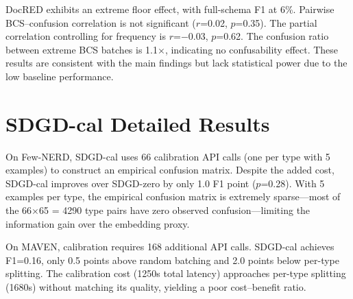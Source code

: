 \documentclass[11pt,a4paper]{article}
\begin{document}
DocRED exhibits an extreme floor effect, with full-schema F1 at 6\%.
Pairwise BCS--confusion correlation is not significant ($r$=0.02, $p$=0.35).
The partial correlation controlling for frequency is $r$=$-$0.03, $p$=0.62.
The confusion ratio between extreme BCS batches is 1.1$\times$, indicating no confusability effect.
These results are consistent with the main findings but lack statistical power due to the low baseline performance.

\section{SDGD-cal Detailed Results}

On Few-NERD, SDGD-cal uses 66 calibration API calls (one per type with 5 examples) to construct an empirical confusion matrix.
Despite the added cost, SDGD-cal improves over SDGD-zero by only 1.0 F1 point ($p$=0.28).
With 5 examples per type, the empirical confusion matrix is extremely sparse---most of the 66$\times$65 = 4290 type pairs have zero observed confusion---limiting the information gain over the embedding proxy.

On MAVEN, calibration requires 168 additional API calls.
SDGD-cal achieves F1=0.16, only 0.5 points above random batching and 2.0 points below per-type splitting.
The calibration cost (1250s total latency) approaches per-type splitting (1680s) without matching its quality, yielding a poor cost--benefit ratio.
\end{document}
